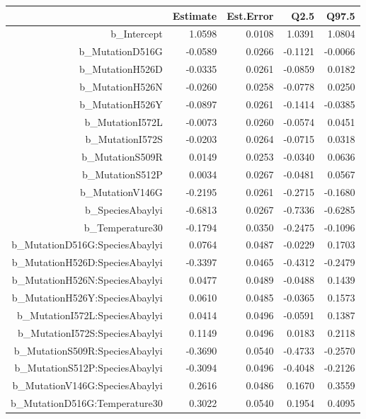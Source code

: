 \begin{table}[ht]
\centering
\begingroup\footnotesize
\begin{tabular}{rrrrr}
  \hline
 & Estimate & Est.Error & Q2.5 & Q97.5 \\ 
  \hline
b\_Intercept & 1.0598 & 0.0108 & 1.0391 & 1.0804 \\ 
  b\_MutationD516G & -0.0589 & 0.0266 & -0.1121 & -0.0066 \\ 
  b\_MutationH526D & -0.0335 & 0.0261 & -0.0859 & 0.0182 \\ 
  b\_MutationH526N & -0.0260 & 0.0258 & -0.0778 & 0.0250 \\ 
  b\_MutationH526Y & -0.0897 & 0.0261 & -0.1414 & -0.0385 \\ 
  b\_MutationI572L & -0.0073 & 0.0260 & -0.0574 & 0.0451 \\ 
  b\_MutationI572S & -0.0203 & 0.0264 & -0.0715 & 0.0318 \\ 
  b\_MutationS509R & 0.0149 & 0.0253 & -0.0340 & 0.0636 \\ 
  b\_MutationS512P & 0.0034 & 0.0267 & -0.0481 & 0.0567 \\ 
  b\_MutationV146G & -0.2195 & 0.0261 & -0.2715 & -0.1680 \\ 
  b\_SpeciesAbaylyi & -0.6813 & 0.0267 & -0.7336 & -0.6285 \\ 
  b\_Temperature30 & -0.1794 & 0.0350 & -0.2475 & -0.1096 \\ 
  b\_MutationD516G:SpeciesAbaylyi & 0.0764 & 0.0487 & -0.0229 & 0.1703 \\ 
  b\_MutationH526D:SpeciesAbaylyi & -0.3397 & 0.0465 & -0.4312 & -0.2479 \\ 
  b\_MutationH526N:SpeciesAbaylyi & 0.0477 & 0.0489 & -0.0488 & 0.1439 \\ 
  b\_MutationH526Y:SpeciesAbaylyi & 0.0610 & 0.0485 & -0.0365 & 0.1573 \\ 
  b\_MutationI572L:SpeciesAbaylyi & 0.0414 & 0.0496 & -0.0591 & 0.1387 \\ 
  b\_MutationI572S:SpeciesAbaylyi & 0.1149 & 0.0496 & 0.0183 & 0.2118 \\ 
  b\_MutationS509R:SpeciesAbaylyi & -0.3690 & 0.0540 & -0.4733 & -0.2570 \\ 
  b\_MutationS512P:SpeciesAbaylyi & -0.3094 & 0.0496 & -0.4048 & -0.2126 \\ 
  b\_MutationV146G:SpeciesAbaylyi & 0.2616 & 0.0486 & 0.1670 & 0.3559 \\ 
  b\_MutationD516G:Temperature30 & 0.3022 & 0.0540 & 0.1954 & 0.4095 \\ 

\end{tabular}
\end{table}
